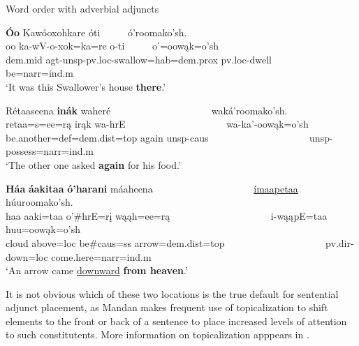 \begin{exe}
    \item\label{Ch5AdjunctWordOrder} Word order with adverbial adjuncts

    \begin{xlist}
        \item\label{Ch5AdjunctWordOrderA} \glll \textbf{Óo} Kawóoxohkare óti ~ ~ ~ ó'roomako'sh.\\
        oo ka-wV-o-xok=ka=re o-ti ~ ~ ~ o'=oowąk=o'sh\\
        dem.mid agt-unsp-pv.loc-\textnormal{swallow}=hab=dem.prox pv.loc-\textnormal{dwell} ~ ~ ~ \textnormal{be}=narr=ind.m\\
        \glt `It was this Swallower's house \textbf{there}.' \citep[149]{hollow1973a}

        \item\label{Ch5AdjunctWordOrderB} \glll Rétaaseena \textbf{inák} waheré   ~ ~ ~ ~ ~ ~ ~ ~ ~ ~ ~ ~ waká'roomako'sh.\\
        retaa=s=ee=rą irąk wa-hrE   ~ ~ ~ ~ ~ ~ ~ ~ ~ ~ ~ ~ wa-ka'-oowąk=o'sh\\
        \textnormal{be.another}=def=dem.dist=top \textnormal{again} unsp-caus  ~ ~ ~ ~ ~ ~  ~ ~ ~ ~ ~ ~ unsp-\textnormal{possess}=narr=ind.m\\
        \glt `The other one asked \textbf{again} for his food.' \citep[93]{hollow1973b}
        
        \item\label{Ch5AdjunctWordOrderC} \glll \textbf{Háa} \textbf{áakitaa} \textbf{ó'harani} máaheena  ~ ~ ~ ~ ~ ~  ~ ~ ~ ~ ~ ~ \uline{ímaapetaa} húuroomako'sh.\\
        haa aaki=taa o'\#hrE=rį wąąh=ee=rą  ~ ~ ~ ~ ~ ~  ~ ~ ~ ~ ~ ~ i-wąąpE=taa huu=oowąk=o'sh\\
        \textnormal{cloud} \textnormal{above}=loc \textnormal{be}\#caus=ss \textnormal{arrow}=dem.dist=top  ~ ~ ~ ~ ~ ~  ~ ~ ~ ~ ~ ~ pv.dir-\textnormal{down}=loc \textnormal{come.here}=narr=ind.m\\
        \glt `An arrow came \uline{downward} \textbf{from heaven}.' \citep[154]{hollow1973a}
        
    \end{xlist}
\end{exe}

It is not obvious which of these two locations is the true default for sentential adjunct placement, as Mandan makes frequent use of topicalization to shift elements to the front or back of a sentence to place increased levels of attention to such constitutents. More information on topicalization apppears in .

